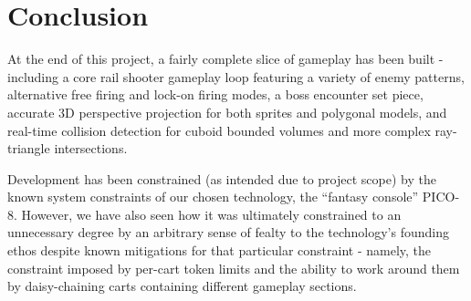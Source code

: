 \documentclass[11pt]{article}
\begin{document}
\section{Conclusion}
At the end of this project, a fairly complete slice of gameplay has been built - including
a core rail shooter gameplay loop featuring a variety of enemy patterns, alternative free
firing and lock-on firing modes, a boss encounter set piece, 
accurate 3D perspective projection for both sprites  and polygonal models,
and real-time collision detection for cuboid bounded volumes and
more complex ray-triangle intersections.

Development has been constrained (as intended due to project scope) by the known
system constraints of our chosen technology, the ``fantasy console'' PICO-8. However,
we have also seen how it was ultimately constrained to an unnecessary degree by
an arbitrary sense of fealty to the technology's founding ethos despite known
mitigations for that particular constraint - namely, the constraint imposed by
per-cart token limits and the ability to work around them by daisy-chaining
carts containing different gameplay sections.

\printbibliography
\end{document}

